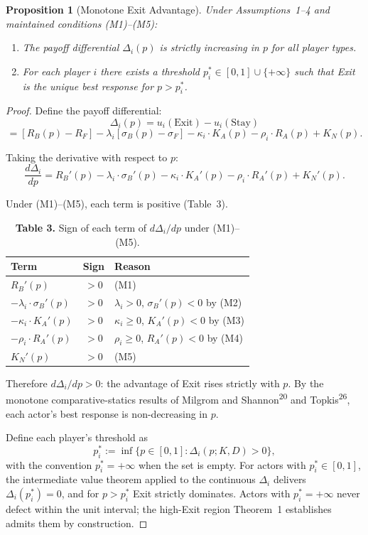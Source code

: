 \documentclass[12pt]{article}
\newtheorem{proposition}{Proposition}
\theoremstyle{definition}
\theoremstyle{remark}
\begin{document}
\begin{proposition}[Monotone Exit Advantage]
Under Assumptions~1--4 and maintained conditions (M1)--(M5):

\begin{enumerate}[label=(\roman*)]
\item The payoff differential $\Delta_i(p)$ is strictly increasing
in $p$ for all player types.
\item For each player $i$ there exists a threshold
$p_i^* \in [0, 1] \cup \{+\infty\}$ such that Exit is the unique
best response for $p > p_i^*$.
\end{enumerate}
\end{proposition}

\begin{proof}
Define the payoff differential:
\[
\Delta_i(p) = u_i(\text{Exit}) - u_i(\text{Stay})
\]
\[
= [R_B(p) - R_F] - \lambda_i[\sigma_B(p) - \sigma_F] - \kappa_i \cdot K_A(p) - \rho_i \cdot R_A(p) + K_N(p).
\]

Taking the derivative with respect to $p$:
\[
\frac{d\Delta_i}{dp} = R_B'(p) - \lambda_i \cdot \sigma_B'(p) - \kappa_i \cdot K_A'(p) - \rho_i \cdot R_A'(p) + K_N'(p).
\]

Under (M1)--(M5), each term is positive (Table~3).

\begin{table}[h]
\centering
\caption*{\textbf{Table 3.} Sign of each term of $d\Delta_i/dp$ under (M1)--(M5).}
\begin{tabular}{lcl}
\toprule
Term & Sign & Reason \\
\midrule
$R_B'(p)$ & $> 0$ & (M1) \\
$-\lambda_i \cdot \sigma_B'(p)$ & $> 0$ & $\lambda_i > 0$, $\sigma_B'(p) < 0$ by (M2) \\
$-\kappa_i \cdot K_A'(p)$ & $> 0$ & $\kappa_i \geq 0$, $K_A'(p) < 0$ by (M3) \\
$-\rho_i \cdot R_A'(p)$ & $> 0$ & $\rho_i \geq 0$, $R_A'(p) < 0$ by (M4) \\
$K_N'(p)$ & $> 0$ & (M5) \\
\bottomrule
\end{tabular}
\end{table}

\noindent Therefore $d\Delta_i/dp > 0$: the advantage of Exit rises strictly
with $p$. By the monotone comparative-statics results of Milgrom
and Shannon\textsuperscript{20} and Topkis\textsuperscript{26}, each
actor's best response is non-decreasing in $p$.

Define each player's threshold as
\[
p_i^* := \inf\{p \in [0, 1] : \Delta_i(p; K, D) > 0\},
\]
with the convention $p_i^* = +\infty$ when the set is empty. For
actors with $p_i^* \in [0, 1]$, the intermediate value theorem
applied to the continuous $\Delta_i$ delivers
$\Delta_i(p_i^*) = 0$, and for $p > p_i^*$ Exit strictly dominates.
Actors with $p_i^* = +\infty$ never defect within the unit
interval; the high-Exit region Theorem~1 establishes
admits them by construction.


\end{proof}
\end{document}
